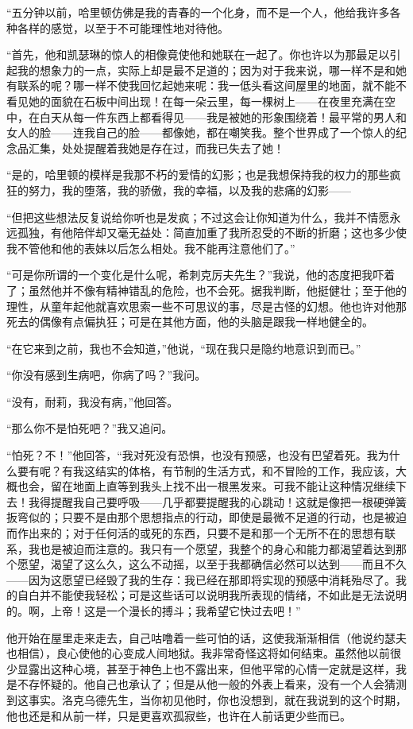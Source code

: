 \par “五分钟以前，哈里顿仿佛是我的青春的一个化身，而不是一个人，他给我许多各种各样的感觉，以至于不可能理性地对待他。
\par “首先，他和凯瑟琳的惊人的相像竟使他和她联在一起了。你也许以为那最足以引起我的想象力的一点，实际上却是最不足道的；因为对于我来说，哪一样不是和她有联系的呢？哪一样不使我回忆起她来呢：我一低头看这间屋里的地面，就不能不看见她的面貌在石板中间出现！在每一朵云里，每一棵树上——在夜里充满在空中，在白天从每一件东西上都看得见——我是被她的形象围绕着！最平常的男人和女人的脸——连我自己的脸——都像她，都在嘲笑我。整个世界成了一个惊人的纪念品汇集，处处提醒着我她是存在过，而我已失去了她！
\par “是的，哈里顿的模样是我那不朽的爱情的幻影；也是我想保持我的权力的那些疯狂的努力，我的堕落，我的骄傲，我的幸福，以及我的悲痛的幻影——
\par “但把这些想法反复说给你听也是发疯；不过这会让你知道为什么，我并不情愿永远孤独，有他陪伴却又毫无益处：简直加重了我所忍受的不断的折磨；这也多少使我不管他和他的表妹以后怎么相处。我不能再注意他们了。”
\par “可是你所谓的一个变化是什么呢，希刺克厉夫先生？”我说，他的态度把我吓着了；虽然他并不像有精神错乱的危险，也不会死。据我判断，他挺健壮；至于他的理性，从童年起他就喜欢思索一些不可思议的事，尽是古怪的幻想。他也许对他那死去的偶像有点偏执狂；可是在其他方面，他的头脑是跟我一样地健全的。
\par “在它来到之前，我也不会知道，”他说，“现在我只是隐约地意识到而已。”
\par “你没有感到生病吧，你病了吗？”我问。
\par “没有，耐莉，我没有病，”他回答。
\par “那么你不是怕死吧？”我又追问。
\par “怕死？不！”他回答，“我对死没有恐惧，也没有预感，也没有巴望着死。我为什么要有呢？有我这结实的体格，有节制的生活方式，和不冒险的工作，我应该，大概也会，留在地面上直等到我头上找不出一根黑发来。可我不能让这种情况继续下去！我得提醒我自己要呼吸——几乎都要提醒我的心跳动！这就是像把一根硬弹簧扳弯似的；只要不是由那个思想指点的行动，即使是最微不足道的行动，也是被迫而作出来的；对于任何活的或死的东西，只要不是和那一个无所不在的思想有联系，我也是被迫而注意的。我只有一个愿望，我整个的身心和能力都渴望着达到那个愿望，渴望了这么久，这么不动摇，以至于我都确信必然可以达到——而且不久——因为这愿望已经毁了我的生存：我已经在那即将实现的预感中消耗殆尽了。我的自白并不能使我轻松；可是这些话可以说明我所表现的情绪，不如此是无法说明的。啊，上帝！这是一个漫长的搏斗；我希望它快过去吧！”
\par 他开始在屋里走来走去，自己咕噜着一些可怕的话，这使我渐渐相信（他说约瑟夫也相信），良心使他的心变成人间地狱。我非常奇怪这将如何结束。虽然他以前很少显露出这种心境，甚至于神色上也不露出来，但他平常的心情一定就是这样，我是不存怀疑的。他自己也承认了；但是从他一般的外表上看来，没有一个人会猜测到这事实。洛克乌德先生，当你初见他时，你也没想到，就在我说到的这个时期，他也还是和从前一样，只是更喜欢孤寂些，也许在人前话更少些而已。


